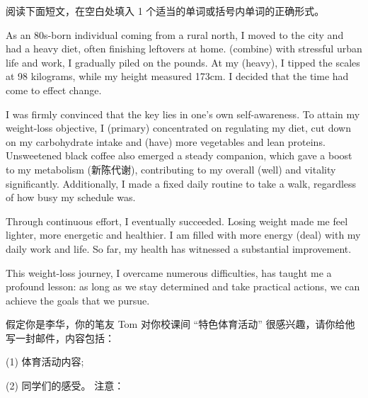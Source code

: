 \documentclass{英语试卷}
\begin{document}
\par 阅读下面短文，在空白处填入 1 个适当的单词或括号内单词的正确形式。\par
\par As an 80s-born individual coming from a rural north, I moved to the city and had a heavy diet, often finishing leftovers at home.  (combine) with stressful urban life and work, I gradually piled on the pounds. At my  (heavy), I tipped the scales at 98 kilograms, while my height measured 173cm. I decided that the time had come to effect  change.\par
\par I was firmly convinced that the key lies in one's own self-awareness. To attain my weight-loss objective, I  (primary) concentrated on regulating my diet, cut down on my carbohydrate intake and  (have) more vegetables and lean proteins. Unsweetened black coffee also emerged  a steady companion, which gave a boost to my metabolism (新陈代谢), contributing to my overall  (well) and vitality significantly. Additionally, I made  a fixed daily routine to take a walk, regardless of how busy my schedule was.\par
\par Through continuous effort, I eventually succeeded. Losing weight made me feel lighter, more energetic and healthier. I am filled with more energy  (deal) with my daily work and life. So far, my health has witnessed a substantial improvement.\par
\par This weight-loss journey,  I overcame numerous difficulties, has taught me a profound lesson: as long as we stay determined and take practical actions, we can achieve the goals that we pursue.\par
{}
\par 假定你是李华，你的笔友 Tom 对你校课间 “特色体育活动” 很感兴趣，请你给他写一封邮件，内容包括：\par
\par (1) 体育活动内容;\par
\par (2) 同学们的感受。 注意：\par
\end{document}
